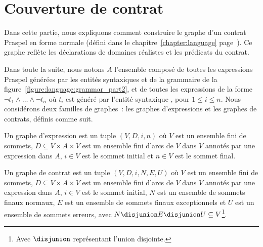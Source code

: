 \section{Couverture de contrat}
\label{section:test:contract}

Dans cette partie, nous expliquons comment construire le graphe d'un contrat
Praspel en forme normale (défini dans le chapitre~\ref{chapter:language}
page~\pageref{chapter:language}). Ce graphe reflète les déclarations de domaines
réalistes et les prédicats du contrat.

Dans toute la suite, nous notons $A$ l'ensemble composé de toutes les
expressions Praspel générées par les entités syntaxiques  et
 de la grammaire de la
figure~\ref{figure:language:grammar_part2}, et de toutes les expressions de la
forme $\neg t_1 \land \dots \land \neg t_n$ où $t_i$ est généré par l'entité
syntaxique , pour $1 \leq i \leq n$. Nous
considérons deux familles de graphes~: les {\strong graphes d'expressions}
et les {\strong graphes de contrats}, définis comme suit.

\begin{definition}

Un {\strong graphe d'expression} est un tuple $(V, D, i, n)$ où $V$ est un
ensemble fini de {\strong sommets}, $D \subseteq V \times A \times V$ est un
ensemble fini d'{\strong arcs} de $V$ dans $V$ annotés par une {\strong
expression} dans $A$, $i \in V$ est le {\strong sommet initial} et $n \in V$ est
le {\strong sommet final}.

\end{definition}

\begin{definition}

Un {\strong graphe de contrat} est un tuple $(V, D, i, N, E, U)$ où $V$ est un
ensemble fini de {\strong sommets}, $D \subseteq V \times A \times V$ est un
ensemble fini d'{\strong arcs} de $V$ dans $V$ annotés par une expression dans
$A$, $i \in V$ est le {\strong sommet initial}, $N$ est un ensemble de {\strong
sommets finaux normaux}, $E$ est un ensemble de {\strong sommets finaux
exceptionnels} et $U$ est un ensemble de {\strong sommets erreurs}, avec $N
\disjunion E \disjunion U \subseteq V$\footnote{Avec $\disjunion$ représentant
l'union disjointe.}.

\end{definition}

